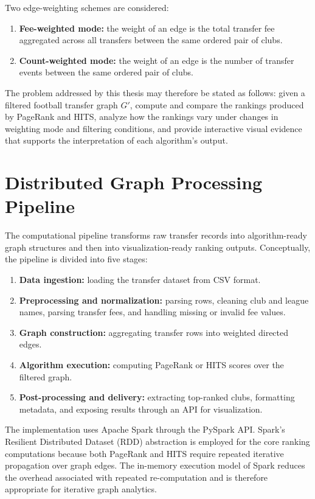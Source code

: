 Two edge-weighting schemes are considered:
\begin{enumerate}
    \item \textbf{Fee-weighted mode:} the weight of an edge is the total transfer fee aggregated across all transfers between the same ordered pair of clubs.
    \item \textbf{Count-weighted mode:} the weight of an edge is the number of transfer events between the same ordered pair of clubs.
\end{enumerate}

The problem addressed by this thesis may therefore be stated as follows: given a filtered football transfer graph $G'$, compute and compare the rankings produced by PageRank and HITS, analyze how the rankings vary under changes in weighting mode and filtering conditions, and provide interactive visual evidence that supports the interpretation of each algorithm's output.


\section{Distributed Graph Processing Pipeline}
\label{sec:pipeline}

The computational pipeline transforms raw transfer records into algorithm-ready graph structures and then into visualization-ready ranking outputs. Conceptually, the pipeline is divided into five stages:

\begin{enumerate}
    \item \textbf{Data ingestion:} loading the transfer dataset from CSV format.
    \item \textbf{Preprocessing and normalization:} parsing rows, cleaning club and league names, parsing transfer fees, and handling missing or invalid fee values.
    \item \textbf{Graph construction:} aggregating transfer rows into weighted directed edges.
    \item \textbf{Algorithm execution:} computing PageRank or HITS scores over the filtered graph.
    \item \textbf{Post-processing and delivery:} extracting top-ranked clubs, formatting metadata, and exposing results through an API for visualization.
\end{enumerate}

The implementation uses Apache Spark through the PySpark API. Spark's Resilient Distributed Dataset (RDD) abstraction is employed for the core ranking computations because both PageRank and HITS require repeated iterative propagation over graph edges. The in-memory execution model of Spark reduces the overhead associated with repeated re-computation and is therefore appropriate for iterative graph analytics.


